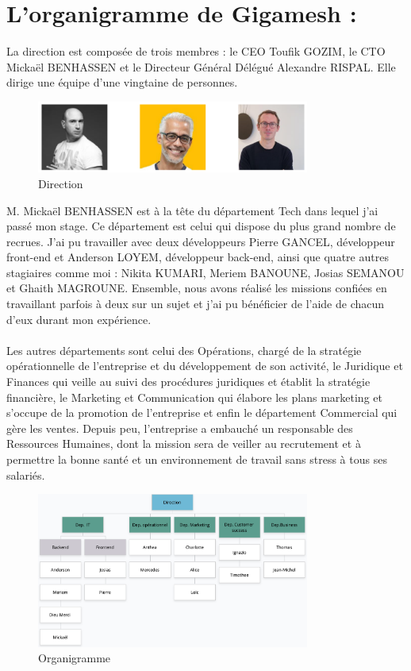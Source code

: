 \section{L’organigramme de Gigamesh :}
La direction est composée de trois membres : le CEO Toufik GOZIM, le CTO Mickaël BENHASSEN et le Directeur Général Délégué Alexandre RISPAL. Elle dirige une équipe d’une vingtaine de personnes.
 \begin{figure}[H]
            \centering
                \includegraphics[width=0.8\textwidth]{Figures/direction}
	       \decoRule
		\caption[Direction]{Direction}
	\label{fig:Direction}
\end{figure}
M. Mickaël BENHASSEN est à la tête du département Tech dans lequel j’ai passé  mon stage. Ce département est celui qui dispose du plus grand nombre de recrues. J’ai pu travailler avec deux développeurs Pierre GANCEL, développeur front-end et Anderson LOYEM, développeur back-end, ainsi que quatre autres stagiaires comme moi :
Nikita KUMARI, Meriem BANOUNE, Josias SEMANOU et Ghaith MAGROUNE. Ensemble, nous avons réalisé les missions confiées en travaillant parfois à deux sur un sujet et j’ai pu bénéficier de l’aide de chacun d’eux durant mon expérience.\\ \\ Les autres départements sont celui des Opérations, chargé de la stratégie opérationnelle de l'entreprise et du développement de son activité, le Juridique et Finances qui veille au suivi des procédures juridiques et établit la stratégie financière, le Marketing et Communication qui élabore les plans marketing et s’occupe de la promotion de l’entreprise et enfin le département Commercial qui gère les ventes. Depuis peu, l’entreprise a embauché un responsable des Ressources Humaines, dont la mission sera de veiller au recrutement et à permettre la bonne santé et un environnement de travail sans stress à tous ses salariés.

 \begin{figure}[H]
            \centering
                \includegraphics[width=0.8\textwidth]{Figures/orga}
	       \decoRule
		\caption[Organigramme]{Organigramme}
	\label{fig:Organigramme}
\end{figure}
\newpage
